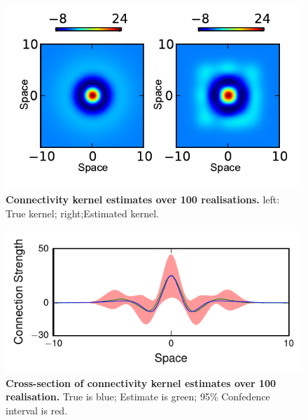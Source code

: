 \documentclass[]{article}
\begin{document}
\begin{figure}[!ht]
\begin{center}
\includegraphics{./Figures/KernelEstimate.pdf}
\end{center}
\caption{{\bf Connectivity kernel estimates over 100 realisations.} left: True kernel; right;Estimated kernel.}
\label{fig:KernelEstimates}
\end{figure}

\begin{figure}[!ht]
\begin{center}
\includegraphics{./Figures/KernelEstimateCrossSection.pdf}
\end{center}
\caption{{\bf Cross-section of connectivity kernel estimates over 100 realisation.} True is blue; Estimate is green; 95\% Confedence interval is red.}
\label{fig:KernelEstimateCrossSection}
\end{figure}
\end{document}
